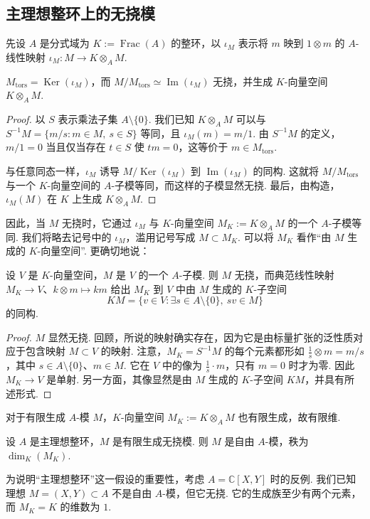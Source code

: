 \subsection{主理想整环上的无挠模}\label{sec:galois-1-10-3}
先设 $A$ 是分式域为 $K:=\operatorname{Frac}(A)$ 的整环，以 $\iota_M$ 表示将 $m$ 映到 $1\otimes m$ 的 $A$-线性映射 $\iota_M\colon M\longrightarrow K\otimes_A M$.
\begin{lemma*}
$M_{\mathrm{tors}}=\operatorname{Ker}(\iota_M)$，而 $M/M_{\mathrm{tors}}\simeq\operatorname{Im}(\iota_M)$ 无挠，并生成 $K$-向量空间 $K\otimes_A M$.
\end{lemma*}
\begin{proof}
以 $S$ 表示乘法子集 $A\setminus\{0\}$. 我们已知 $K\otimes_A M$ 可以与 $S^{-1}M=\{m/s:m\in M,\ s\in S\}$ 等同，且 $\iota_M(m)=m/1$. 由 $S^{-1}M$ 的定义，$m/1=0$ 当且仅当存在 $t\in S$ 使 $tm=0$，这等价于 $m\in M_{\mathrm{tors}}$.

与任意同态一样，$\iota_M$ 诱导 $M/\operatorname{Ker}(\iota_M)$ 到 $\operatorname{Im}(\iota_M)$ 的同构. 这就将 $M/M_{\mathrm{tors}}$ 与一个 $K$-向量空间的 $A$-子模等同，而这样的子模显然无挠. 最后，由构造，$\iota_M(M)$ 在 $K$ 上生成 $K\otimes_A M$.
\end{proof}
因此，当 $M$ 无挠时，它通过 $\iota_M$ 与 $K$-向量空间 $M_K:=K\otimes_A M$ 的一个 $A$-子模等同. 我们将略去记号中的 $\iota_M$，滥用记号写成 $M\subset M_K$. 可以将 $M_K$ 看作``由 $M$ 生成的 $K$-向量空间''. 更确切地说：
\begin{lemma*}
设 $V$ 是 $K$-向量空间，$M$ 是 $V$ 的一个 $A$-子模. 则 $M$ 无挠，而典范线性映射 $M_K\longrightarrow V$、$k\otimes m\mapsto km$ 给出 $M_K$ 到 $V$ 中由 $M$ 生成的 $K$-子空间
\[KM=\{v\in V:\exists s\in A\setminus\{0\},\ sv\in M\}\]
的同构.
\end{lemma*}
\begin{proof}
$M$ 显然无挠. 回顾，所说的映射确实存在，因为它是由标量扩张的泛性质对应于包含映射 $M\subset V$ 的映射. 注意，$M_K=S^{-1}M$ 的每个元素都形如 $\frac1s\otimes m=m/s$，其中 $s\in A\setminus\{0\}$、$m\in M$. 它在 $V$ 中的像为 $\frac1s\cdot m$，只有 $m=0$ 时才为零. 因此 $M_K\longrightarrow V$ 是单射. 另一方面，其像显然是由 $M$ 生成的 $K$-子空间 $KM$，并具有所述形式.
\end{proof}
对于有限生成 $A$-模 $M$，$K$-向量空间 $M_K:=K\otimes_A M$ 也有限生成，故有限维.
\begin{theorem*}
设 $A$ 是主理想整环，$M$ 是有限生成无挠模. 则 $M$ 是自由 $A$-模，秩为 $\dim_K(M_K)$.
\end{theorem*}
\begin{example*}
为说明``主理想整环''这一假设的重要性，考虑 $A=\mathbb C[X,Y]$ 时的反例. 我们已知理想 $M=(X,Y)\subset A$ 不是自由 $A$-模，但它无挠. 它的生成族至少有两个元素，而 $M_K=K$ 的维数为 $1$.
\end{example*}
